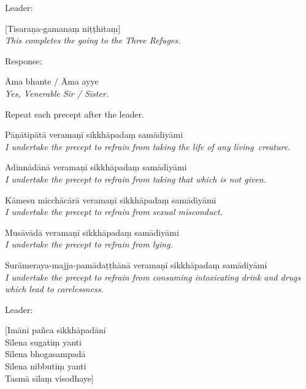 \begin{instruction}
  Leader:
\end{instruction}

[Tisaraṇa-gamanaṃ niṭṭhitaṃ]\\
\emph{This completes the going to the Three Refuges.}

\begin{instruction}
  Response:
\end{instruction}

Āma bhante / Āma ayye\\
\emph{Yes, Venerable Sir / Sister.}

\begin{instruction}
  Repeat each precept after the leader.
\end{instruction}

{\raggedright

\begin{packedenumerate}
  \item Pāṇātipātā veramaṇī sikkhāpadaṃ samādiyāmi\\
    \emph{I undertake the precept to refrain from taking the life of any living~creature.}
  \item Adinnādānā veramaṇī sikkhāpadaṃ samādiyāmi\\
    \emph{I undertake the precept to refrain from taking that which is not given.}
  \item Kāmesu micchācārā veramaṇī sikkhāpadaṃ samādiyāmi\\
    \emph{I undertake the precept to refrain from sexual misconduct.}
  \item Musāvādā veramaṇī sikkhāpadaṃ samādiyāmi\\
    \emph{I undertake the precept to refrain from lying.}
  \item Surāmeraya-majja-pamādaṭṭhānā veramaṇī sikkhāpadaṃ samādiyāmi\\
    \emph{I undertake the precept to refrain from consuming intoxicating drink and drugs which lead to carelessness.}
\end{packedenumerate}

}

\begin{instruction}
  Leader:
\end{instruction}

[Imāni pañca sikkhāpadāni\\
Sīlena sugatiṃ yanti\\
Sīlena bhogasampadā\\
Sīlena nibbutiṃ yanti\\
Tasmā sīlaṃ visodhaye]

